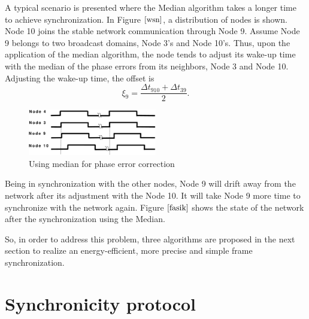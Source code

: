 \documentclass[journal]{IEEEtran}
\begin{document}
\par A typical scenario is presented where the Median algorithm takes a longer time to achieve synchronization. In Figure $\ref{wsn}$, a distribution of nodes is shown. Node 10 joins  the stable network communication through Node 9. Assume Node 9 belongs to two broadcast domains, Node 3's and Node 10's. Thus, upon the application of the median algorithm, the node tends to adjust its wake-up time with the median of the phase errors from its neighbors, Node 3 and Node 10. Adjusting the wake-up time, the offset is
\begin{equation}
\xi_9 = \frac{\Delta t_{910} + \Delta t_{39}}{2}.
\end{equation}
\begin{figure}
\centering
\includegraphics[width= 0.5\textwidth]{offsetpic}
\caption{Using median for phase error correction} \label{fasik}
\end{figure}
Being in synchronization with the other nodes, Node 9 will drift away from the network after
its adjustment with the Node 10. It will take Node 9 more time to synchronize with the network again. Figure $\ref{fasik}$ shows the state of the network after the
synchronization using the Median.
\par So, in order to address this problem, three algorithms are proposed in the next section to realize an energy-efficient, more precise and simple frame synchronization.
\section{\textbf{Synchronicity protocol}}
\end{document}
